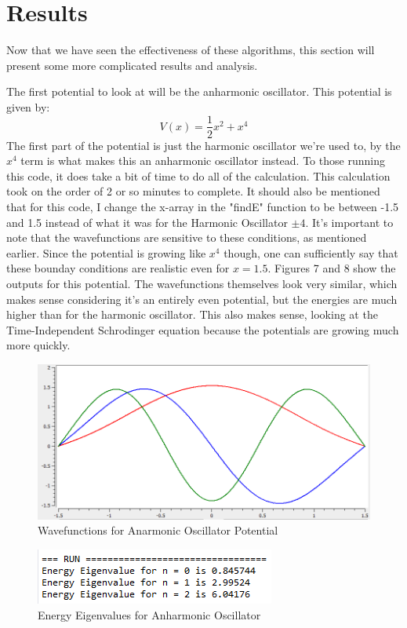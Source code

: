 \documentclass[11pt]{article} %
\begin{document}
\section{Results}
Now that we have seen the effectiveness of these algorithms, this section will present some more complicated results and analysis. 
\par The first potential to look at will be the anharmonic oscillator. This potential is given by:
\begin{equation}
V(x) = \frac{1}{2}x^2 + x^4
\end{equation} 
The first part of the potential is just the harmonic oscillator we're used to, by the $x^4$ term is what makes this an anharmonic oscillator instead. To those running this code, it does take a bit of time to do all of the calculation. This calculation took on the order of 2 or so minutes to complete. It should also be mentioned that for this code, I change the x-array in the "findE" function to be between -1.5 and 1.5 instead of what it was for the Harmonic Oscillator $\pm 4$.  It's important to note that the wavefunctions are sensitive to these conditions, as mentioned earlier. Since the potential is growing like $x^4$ though, one can sufficiently say that these bounday conditions are realistic even for $x = 1.5$.  Figures 7 and 8 show the outputs for this potential. The wavefunctions themselves look very similar, which makes sense considering it's an entirely even potential, but the energies are much higher than for the harmonic oscillator. This also makes sense, looking at the Time-Independent Schrodinger equation because the potentials are growing much more quickly. 
\begin{figure}
\centering
\includegraphics[scale = .5]{fp7}
\caption{Wavefunctions for Anarmonic Oscillator Potential}
\end{figure}
\begin{figure}
\centering
\includegraphics{fp8}
\caption{Energy Eigenvalues for Anharmonic Oscillator}
\end{figure}
\end{document}
